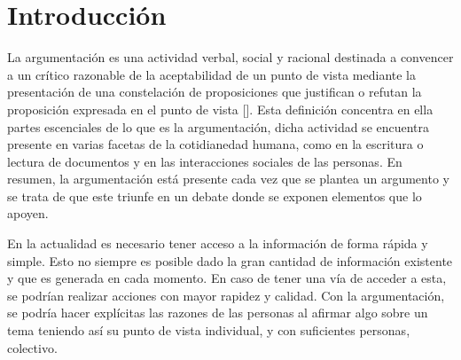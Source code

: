 \chapter*{Introducción}\label{chapter:introduction}



La argumentación es una actividad verbal, social y racional destinada a convencer 
a un crítico razonable de la aceptabilidad de un punto de vista mediante la presentación 
de una constelación de proposiciones que justifican o refutan la proposición expresada 
en el punto de vista [\cite{van2004systematic}]. Esta definición concentra en ella 
partes escenciales de lo que es la argumentación, dicha actividad se encuentra presente
en varias facetas de la cotidianedad humana, como en la escritura o lectura de documentos y
en las interacciones sociales de las personas. En resumen, la argumentación está presente 
cada vez que se plantea un argumento y se trata de que este triunfe en un debate donde 
se exponen elementos que lo apoyen.   

En la actualidad es necesario tener acceso a la información
de forma rápida y simple. Esto no siempre es posible dado la gran cantidad de información existente y
que es generada en cada momento. En caso de tener una vía de acceder a esta, se podrían realizar acciones
con mayor rapidez y calidad. Con la argumentación, se podría hacer explícitas las razones de las personas 
al afirmar algo sobre un tema teniendo así su punto de vista individual, y con suficientes personas, colectivo.


